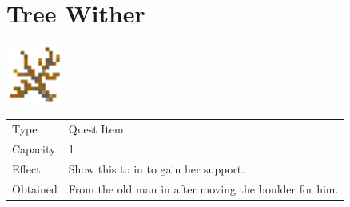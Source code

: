 \section{Tree Wither}
\label{item:tree_wither}

\includegraphics[height=2cm,keepaspectratio]{./resources/items/treewither}

\begin{longtable}{ l p{9cm} }
	Type
	& Quest Item
\\ %
	Capacity
	& 1
\\ %
	Effect
	& Show this to \nameref{char:kaeli} in \nameref{map:foresta} to gain her support.
\\ %
	Obtained
	& From the old man in \nameref{map:level_forest} after moving the boulder for him.
\end{longtable}
